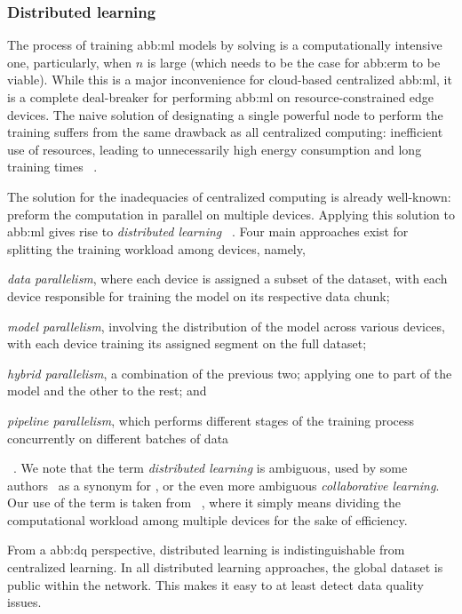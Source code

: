 \subsubsection{Distributed learning}\label{ssub:background:distl}

The process of training \gls{abb:ml} models by solving 
is a computationally intensive one, particularly, when \(n\) is large
(which needs to be the case for \gls{abb:erm} to be viable).
While this is a major inconvenience for cloud-based centralized \gls{abb:ml},
it is a complete deal-breaker for performing \gls{abb:ml} on resource-constrained edge devices.
The naive solution of designating a single powerful node to perform the training
suffers from the same drawback as all centralized computing: inefficient use of resources,
leading to unnecessarily high energy consumption and long training times%
~\cite{wangEdgeAIConvergence2020}.

The solution for the inadequacies of centralized computing is already well-known:
preform the computation in parallel on multiple devices.
Applying this solution to \gls{abb:ml} gives rise to \emph{distributed learning}%
~\cite{wangEdgeAIConvergence2020}.
Four main approaches exist for splitting the training workload
among devices, namely,
\begin{enumerate*}[label=(\arabic*)]
  \item \emph{data parallelism}, where each device is assigned a subset of the dataset, with each device responsible for training the model on its respective data chunk;
  \item \emph{model parallelism},
        involving the distribution of the model across various devices, with each device training its assigned segment on the full dataset;
  \item \emph{hybrid parallelism},
        a combination of the previous two;
        applying one to part of the model and the other to the rest; and
  \item \emph{pipeline parallelism},
        which performs different stages of the training process
        concurrently on different batches of data%
\end{enumerate*}
~\cite{dehghaniDistributedMachineDistributed2023,wangEdgeAIConvergence2020}.
We note that the term \emph{distributed learning} is ambiguous,
  used by some authors~\cite{lyuCollaborativeFairnessFederated2020}
  as a synonym for ,
  or the even more ambiguous \emph{collaborative learning}.
  Our use of the term is taken from%
  ~\cite{wangEdgeAIConvergence2020,dehghaniDistributedMachineDistributed2023},
  where it simply means dividing the computational workload among multiple devices
  for the sake of efficiency.

From a \gls{abb:dq} perspective,
distributed learning is indistinguishable from centralized learning.
In all distributed learning approaches, the global dataset is public within the network.
This makes it easy to at least detect data quality issues.
